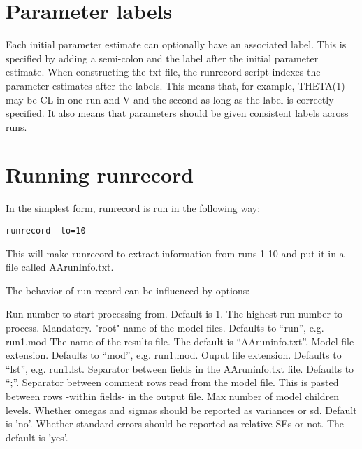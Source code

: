 \section{Parameter labels}
Each initial parameter estimate can optionally have an associated label. This is specified by adding a semi-colon and the label after the initial parameter estimate. When constructing  the txt file, the runrecord script indexes the parameter estimates after the labels. This means that, for example, THETA(1) may be CL in one run and V and the second as long as the label is correctly specified. It also means that parameters should be given consistent labels across runs.

\section{Running runrecord}

In the simplest form, runrecord is run in the following way:
\begin{verbatim}
runrecord -to=10
\end{verbatim}
This will make runrecord to extract information from runs 1-10 and put it in a file called AArunInfo.txt. 

The behavior of run record can be influenced by options:

\begin{optionlist}
Run number to start processing from. Default is 1. 
\nextopt
{}
The highest run number to process. Mandatory. 
\nextopt
{}
"root" name of the model files. Defaults to “run”, e.g. run1.mod 
\nextopt
{}
The name of the results file. The default is “AAruninfo.txt”. 
\nextopt
{}
Model file extension. Defaults to “mod”, e.g. run1.mod. 
\nextopt
{}
Ouput file extension. Defaults to “lst”, e.g. run1.lst. 
\nextopt
{}
Separator between fields in the AAruninfo.txt file. Defaults to “;”. 
\nextopt
{}
Separator between comment rows read from the model file. This is pasted between rows -within fields- in the output file. 
\nextopt
{}
Max number of model children levels. 
\nextopt
{}
Whether omegas and sigmas should be reported as variances or sd. Default is 'no'. 
\nextopt
{}
Whether standard errors should be reported as relative SEs or not. The default is 'yes'. 
\nextopt
\end{optionlist}

